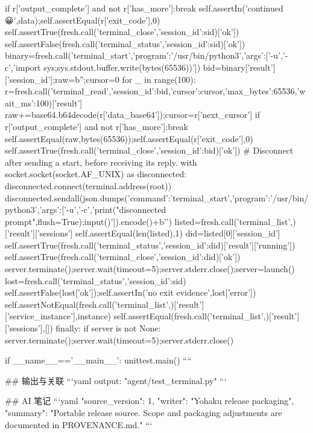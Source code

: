                     if r['output_complete'] and not r['has_more']:break
                self.assertIn('continued 😀',data);self.assertEqual(r['exit_code'],0)
                self.assertTrue(fresh.call('terminal_close',{'session_id':sid})['ok'])
                self.assertFalse(fresh.call('terminal_status',{'session_id':sid})['ok'])
                binary=fresh.call('terminal_start',{'program':'/usr/bin/python3','args':['-u','-c','import sys;sys.stdout.buffer.write(bytes(65536))']})
                bid=binary['result']['session_id'];raw=b'';cursor=0
                for _ in range(100):
                    r=fresh.call('terminal_read',{'session_id':bid,'cursor':cursor,'max_bytes':65536,'wait_ms':100})['result']
                    raw+=base64.b64decode(r['data_base64']);cursor=r['next_cursor']
                    if r['output_complete'] and not r['has_more']:break
                self.assertEqual(raw,bytes(65536));self.assertEqual(r['exit_code'],0)
                self.assertTrue(fresh.call('terminal_close',{'session_id':bid})['ok'])
                # Disconnect after sending a start, before receiving its reply.
                with socket.socket(socket.AF_UNIX) as disconnected:
                    disconnected.connect(terminal.address(root))
                    disconnected.sendall(json.dumps({'command':'terminal_start','program':'/usr/bin/python3','args':['-u','-c','print("disconnected prompt",flush=True);input()']}).encode()+b'\n')
                listed=fresh.call('terminal_list',{})['result']['sessions']
                self.assertEqual(len(listed),1)
                did=listed[0]['session_id']
                self.assertTrue(fresh.call('terminal_status',{'session_id':did})['result']['running'])
                self.assertTrue(fresh.call('terminal_close',{'session_id':did})['ok'])
                server.terminate();server.wait(timeout=5);server.stderr.close();server=launch()
                lost=fresh.call('terminal_status',{'session_id':sid})
                self.assertFalse(lost['ok']);self.assertIn('no exit evidence',lost['error'])
                self.assertNotEqual(fresh.call('terminal_list',{})['result']['service_instance'],instance)
                self.assertEqual(fresh.call('terminal_list',{})['result']['sessions'],[])
            finally:
                if server is not None:
                    server.terminate();server.wait(timeout=5);server.stderr.close()


if __name__=='__main__': unittest.main()
````

## 输出与关联
```yaml
output: "agent/test_terminal.py"
```

## AI 笔记
```yaml
{"source_version": 1, "writer": "Yohaku release packaging", "summary": "Portable release source. Scope and packaging adjustments are documented in PROVENANCE.md."}
```
